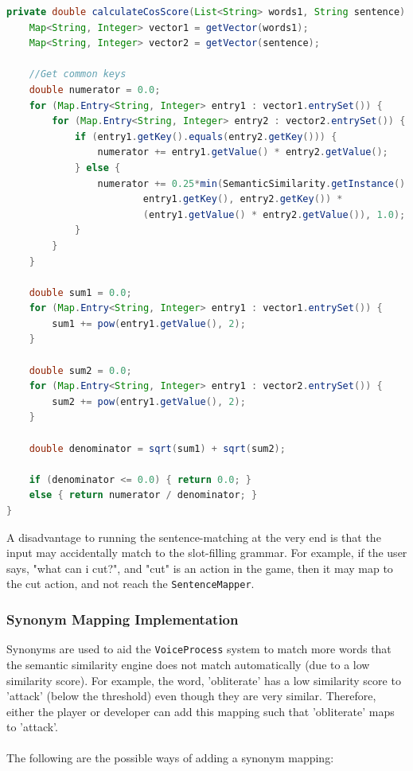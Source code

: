 \documentclass[11pt]{article}
\begin{document}
\begin{lstlisting}[language=Java, caption=SentenceMapper.calculateCosScore(), label=lst:cos-score]
private double calculateCosScore(List<String> words1, String sentence) {
    Map<String, Integer> vector1 = getVector(words1);
    Map<String, Integer> vector2 = getVector(sentence);

    //Get common keys
    double numerator = 0.0;
    for (Map.Entry<String, Integer> entry1 : vector1.entrySet()) {
        for (Map.Entry<String, Integer> entry2 : vector2.entrySet()) {
            if (entry1.getKey().equals(entry2.getKey())) {
                numerator += entry1.getValue() * entry2.getValue();
            } else {
                numerator += 0.25*min(SemanticSimilarity.getInstance().calculateScore(
                        entry1.getKey(), entry2.getKey()) *
                        (entry1.getValue() * entry2.getValue()), 1.0);
            }
        }
    }

    double sum1 = 0.0;
    for (Map.Entry<String, Integer> entry1 : vector1.entrySet()) {
        sum1 += pow(entry1.getValue(), 2);
    }

    double sum2 = 0.0;
    for (Map.Entry<String, Integer> entry1 : vector2.entrySet()) {
        sum2 += pow(entry1.getValue(), 2);
    }

    double denominator = sqrt(sum1) + sqrt(sum2);

    if (denominator <= 0.0) { return 0.0; }
    else { return numerator / denominator; }
}
\end{lstlisting}

A disadvantage to running the sentence-matching at the very end is that the input may accidentally match to the slot-filling grammar. For example, if the user says, "what can i cut?", and "cut" is an action in the game, then it may map to the cut action, and not reach the \texttt{SentenceMapper}.

\subsubsection{Synonym Mapping Implementation}

Synonyms are used to aid the \texttt{VoiceProcess} system to match more words that the semantic similarity engine does not match automatically (due to a low similarity score). For example, the word, 'obliterate' has a low similarity score to 'attack' (below the threshold) even though they are very similar. Therefore, either the player or developer can add this mapping such that 'obliterate' maps to 'attack'.
\\
\\
The following are the possible ways of adding a synonym mapping:
\end{document}
